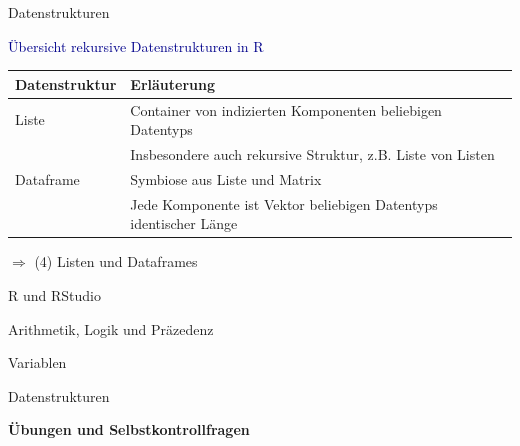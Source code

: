 \documentclass[
  8pt,
  ignorenonframetext,
]{beamer}
\begin{document}
\begin{frame}{Datenstrukturen}
\protect\hypertarget{datenstrukturen-7}{}

\textcolor{darkblue}{Übersicht rekursive Datenstrukturen in R}
\vspace{3mm}

\begin{center}
\begin{tabular}{l|l}
Datenstruktur
& Erläuterung
\\\hline

Liste
& Container von indizierten Komponenten beliebigen Datentyps
\\
& Insbesondere auch rekursive Struktur, z.B. Liste von Listen
\\

Dataframe
& Symbiose aus Liste und Matrix
\\
& Jede Komponente ist Vektor beliebigen Datentyps identischer Länge
\\
\end{tabular}
\end{center}
\vspace{3mm}

\(\Rightarrow\) (4) Listen und Dataframes
\end{frame}

\begin{frame}{}
\protect\hypertarget{section-7}{}
\large
\vfill
{}

R und RStudio

Arithmetik, Logik und Präzedenz

Variablen

Datenstrukturen

\textbf{Übungen und Selbstkontrollfragen}
\end{frame}
\end{document}
